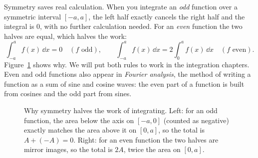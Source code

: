 \begin{connectionbox}
Symmetry saves real calculation. When you integrate
an \emph{odd} function over a symmetric interval $[-a,a]$, the left half exactly
cancels the right half and the integral is $0$, with no further calculation
needed. For an \emph{even} function the two halves are equal, which halves the
work:
\[
  \int_{-a}^{a} f(x)\,\dd x = 0 \quad (f \text{ odd}),
  \qquad
  \int_{-a}^{a} f(x)\,\dd x = 2\int_{0}^{a} f(x)\,\dd x \quad (f \text{ even}).
\]
Figure~\ref{ch02:fig-symmetric-area} shows why. We will put both rules to work in
the integration chapters. Even and odd functions also appear in \emph{Fourier
analysis}, the method of writing a function as a sum of sine and cosine waves:
the even part of a function is built from cosines and the odd part from sines.
\end{connectionbox}

\begin{figure}[htbp]
\centering
{}
\hfill
{}
\caption{Why symmetry halves the work of integrating. Left: for an odd function,
the area below the axis on $[-a,0]$ (counted as negative) exactly matches the area
above it on $[0,a]$, so the total is $A + (-A) = 0$. Right: for an even function
the two halves are mirror images, so the total is $2A$, twice the area on $[0,a]$.}
\label{ch02:fig-symmetric-area}
\end{figure}

